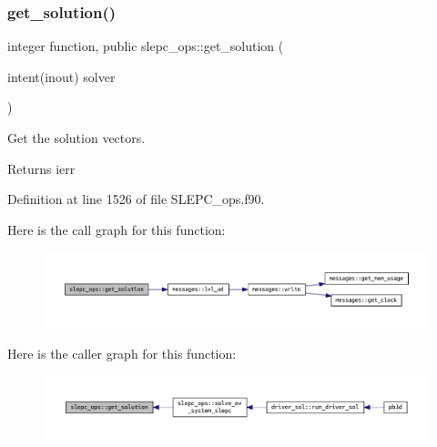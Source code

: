 \subsubsection{\texorpdfstring{get\+\_\+solution()}{get\_solution()}}
{\footnotesize\ttfamily integer function, public slepc\+\_\+ops\+::get\+\_\+solution (\begin{DoxyParamCaption}\item[{intent(inout)}]{solver }\end{DoxyParamCaption})}



Get the solution vectors. 

\begin{DoxyReturn}{Returns}
ierr 
\end{DoxyReturn}


Definition at line 1526 of file S\+L\+E\+P\+C\+\_\+ops.\+f90.

Here is the call graph for this function\+:\nopagebreak
\begin{figure}[H]
\begin{center}
\leavevmode
\includegraphics[width=350pt]{namespaceslepc__ops_aabe2aef90f039316bf3f03e651a6e7e0_cgraph}
\end{center}
\end{figure}
Here is the caller graph for this function\+:\nopagebreak
\begin{figure}[H]
\begin{center}
\leavevmode
\includegraphics[width=350pt]{namespaceslepc__ops_aabe2aef90f039316bf3f03e651a6e7e0_icgraph}
\end{center}
\end{figure}
\mbox{\label{namespaceslepc__ops_a05f8a23335ed47ad1996cddf3bcfdc2e}} 
